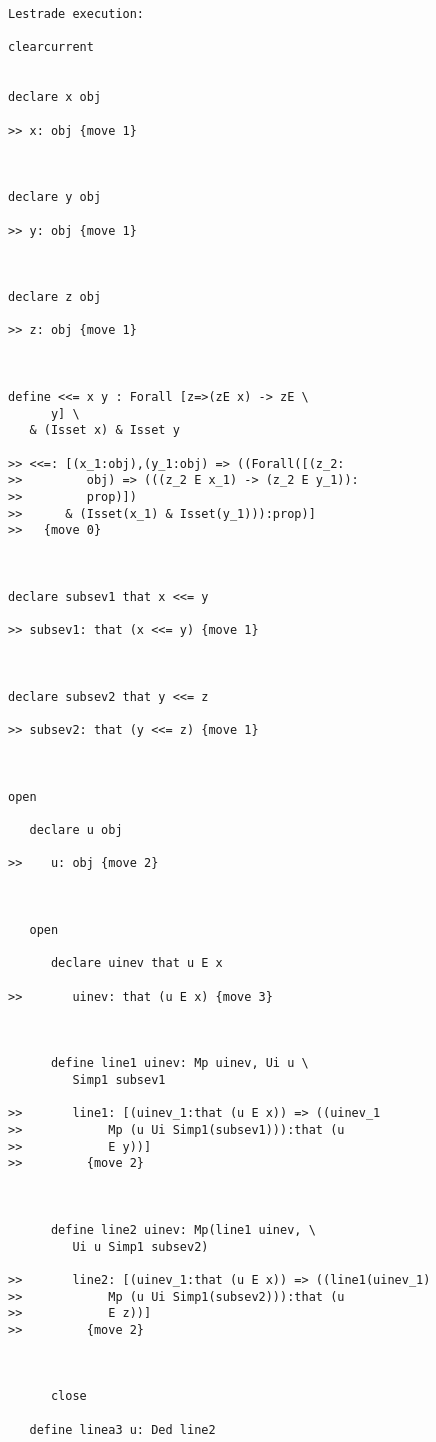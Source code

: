 \documentclass[12pt]{article}
\begin{document}
\begin{verbatim}Lestrade execution:

clearcurrent


declare x obj

>> x: obj {move 1}



declare y obj

>> y: obj {move 1}



declare z obj

>> z: obj {move 1}



define <<= x y : Forall [z=>(zE x) -> zE \
      y] \
   & (Isset x) & Isset y

>> <<=: [(x_1:obj),(y_1:obj) => ((Forall([(z_2:
>>         obj) => (((z_2 E x_1) -> (z_2 E y_1)):
>>         prop)])
>>      & (Isset(x_1) & Isset(y_1))):prop)]
>>   {move 0}



declare subsev1 that x <<= y

>> subsev1: that (x <<= y) {move 1}



declare subsev2 that y <<= z

>> subsev2: that (y <<= z) {move 1}



open

   declare u obj

>>    u: obj {move 2}



   open

      declare uinev that u E x

>>       uinev: that (u E x) {move 3}



      define line1 uinev: Mp uinev, Ui u \
         Simp1 subsev1

>>       line1: [(uinev_1:that (u E x)) => ((uinev_1
>>            Mp (u Ui Simp1(subsev1))):that (u
>>            E y))]
>>         {move 2}



      define line2 uinev: Mp(line1 uinev, \
         Ui u Simp1 subsev2)

>>       line2: [(uinev_1:that (u E x)) => ((line1(uinev_1)
>>            Mp (u Ui Simp1(subsev2))):that (u
>>            E z))]
>>         {move 2}



      close

   define linea3 u: Ded line2


\end{verbatim}
\end{document}
